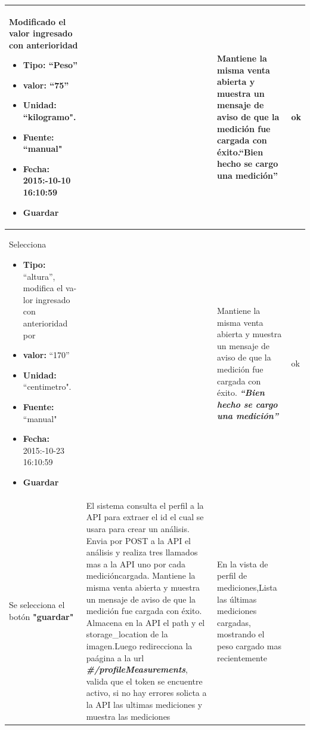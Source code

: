 \documentclass[a4paper,12pt]{article}
\begin{document}
\begin{longtable}{|p{4cm}|p{4cm}|p{4cm}|p{3cm}|}
Modificado el valor ingresado con anterioridad

\begin{itemize}
	\item \textbf{Tipo:} ``Peso''
	\item \textbf{valor: }``75''
	\item \textbf{Unidad:} ``kilogramo".
	\item \textbf{Fuente: }``manual"
	\item \textbf{Fecha: }2015:-10-10 16:10:59
	\item \textbf{ Guardar}
\end{itemize}
&
& Mantiene la misma venta abierta y muestra un mensaje de aviso de que la
medición fue cargada con éxito.\textbf{``Bien hecho se cargo una medición''}
& ok
\\ \hline




Selecciona



\begin{itemize}
	\item \textbf{Tipo:} ``altura'', modifica el va-lor ingresado con anterioridad
	por
	\item \textbf{valor: }``170''
	\item \textbf{Unidad:} ``centimetro".
	\item \textbf{Fuente: }``manual"
	\item \textbf{Fecha: }2015:-10-23 16:10:59
	\item \textbf{ Guardar}
\end{itemize}
&
&
Mantiene la misma venta abierta y muestra un mensaje de aviso de que
la medición fue cargada con éxito.\textit{\textbf{ ``Bien hecho se cargo una medición''}}
& ok
\\ \hline




Se selecciona el botón \textbf{"guardar"}
& El sistema consulta el perfil a la API para extraer el id el cual se usara para crear un análisis. Envia por POST a la API el análisis y realiza tres llamados mas a la API uno por cada medicióncargada.
Mantiene la misma venta abierta y muestra un mensaje de aviso de que
la medición fue cargada con éxito. Almacena en la API el path y el storage\_location de la imagen.Luego redirecciona la paágina a la url
\textit{\textbf{\#/profileMeasurements}}, valida que el token se encuentre activo, si no hay
errores solicta a la API las ultimas mediciones y muestra las mediciones

& En la vista de perfil de mediciones,Lista las últimas mediciones cargadas,
mostrando el peso cargado mas recientemente


\end{longtable}
\end{document}
